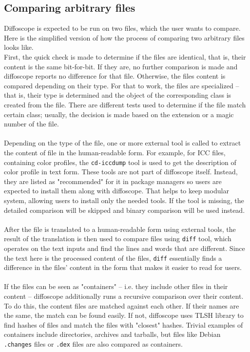 \subsection[Comparing arbitrary files]{Comparing arbitrary files}

Diffoscope is expected to be run on two files, which the user wants to compare. Here is the simplified version of how the process of comparing two arbitrary files looks like.\\
First, the quick check is made to determine if the files are identical, that is, their content is the same bit-for-bit. If they are, no further comparison is made and diffoscope reports no difference for that file. 
Otherwise, the files content is compared depending on their type. For that to work, the files are specialized -- that is, their type is determined and the object of the corresponding class is created from the file. There are different tests used to determine if the file match certain class; usually, the decision is made based on the extension or a magic number of the file.\\\\
Depending on the type of the file, one or more external tool is called to extract the content of file in the human-readable form. For example, for ICC files, containing color profiles, the \texttt{cd-iccdump} tool is used to get the description of color profile in text form. These tools are not part of diffoscope itself. Instead, they are listed as "recommended" for it in package managers so users are expected to install them along with diffoscope. That helps to keep modular system, allowing users to install only the needed tools. If the tool is missing, the detailed comparison will be skipped and binary comparison will be used instead.\\\\
After the file is translated to a human-readable form using external tools, the result of the translation is then used to compare files using \texttt{diff} tool, which operates on the text inputs and find the lines and words that are different. Since the text here is the processed content of the files, \texttt{diff} essentially finds a difference in the files' content in the form that makes it easier to read for users.\\\\
If the files can be seen as "containers" -- i.e. they include other files in their content -- diffoscope additionally runs a recursive comparison over their content. To do this, the content files are matched against each other. If their names are the same, the match can be found easily. If not, diffoscope uses TLSH library\autocite{oliver2013tlsh} to find hashes of files and match the files with "closest" hashes. Trivial examples of containers include directories, archives and tarballs, but files like Debian \texttt{.changes} files or \texttt{.dex} files are also compared as containers.\\\\
